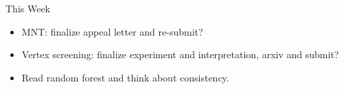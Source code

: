 \documentclass{beamer}
\newtheorem{thm}{Theorem}
\newtheorem{cor}{Corollary}
\providecommand{\mb}[1]{\boldsymbol{#1}}
\begin{document}




\begin{frame}{This Week}
\begin{itemize}
\item MNT: finalize appeal letter and re-submit?
\item Vertex screening: finalize experiment and interpretation, arxiv and submit?
\item Read random forest and think about consistency.
\end{itemize}
\end{frame}



%
%



\end{document}
